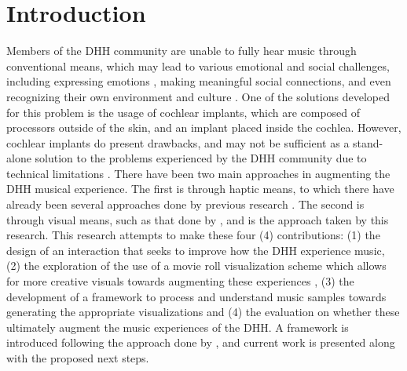 \section{Introduction}


Members of the DHH community are unable to fully hear music through conventional means, which may lead to various emotional and social challenges, including expressing emotions \cite{Walker:2013}, making meaningful social connections, and even recognizing their own environment and culture \cite{Ribiero:2017}. One of the solutions developed for this problem is the usage of cochlear implants, which are composed of processors outside of the skin, and an implant placed inside the cochlea. However, cochlear implants do present drawbacks, and may not be sufficient as a stand-alone solution to the problems experienced by the DHH community due to technical limitations \cite{Gfeller:2012, Drennan:2015,Moran:2016}. There have been two main approaches in augmenting the DHH musical experience. The first is through haptic means, to which there have already been several approaches done by previous research \cite{Jack:2015, Nanayakkara:2009:EME, Petry:2016}. The second is through visual means, such as that done by \cite{Jain:2015}, and is the approach taken by this research. This research attempts to make these four (4) contributions: (1) the design of an interaction that seeks to improve how the DHH experience music, (2) the exploration of the use of a movie roll visualization scheme which allows for more creative visuals towards augmenting these experiences \cite{Nanayakkara:2007}, (3) the development of a framework to process and understand music samples towards generating the appropriate visualizations and (4) the evaluation on whether these ultimately augment the music experiences of the DHH.
A framework is introduced following the approach done by \cite{deja2019myosl}, and current work is presented along with the proposed next steps. 

